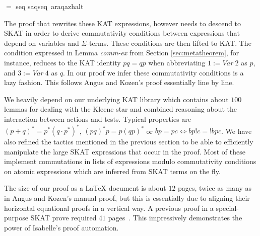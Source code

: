 \documentclass{llncs}
\begin{document}
\begin{isabellebody}
$=$\isanewline
seq {}s{}{}a{}{}q{}{}{}{}{}seq\ {}{}a{}{}r{}{}{}a{}{}q{}{}{}{}{}a{}{}z{}{}halt{}{}\isanewline
\end{isabellebody}

\noindent The proof that rewrites these KAT expressions, however needs
to descend to SKAT in order to derive commutativity conditions between
expressions that depend on variables and $\Sigma$-terms. These
conditions are then lifted to KAT. The condition expressed in Lemma
\textit{comm-ex} from Section \ref{sec:metatheorem}, for instance,
reduces to the KAT identity $pq = qp$ when abbreviating $1 := Var\ 2$
as $p$, and $3 := Var\ 4$ as $q$. In our proof we infer these
commutativity conditions is a lazy fashion. This follows Angus and
Kozen's proof essentially line by line.

We heavily depend on our underlying KAT library which contains about
$100$ lemmas for dealing with the Kleene star and combined reasoning
about the interaction between actions and tests. Typical properties
are $(p+q)^\ast = p^\ast(q\cdot p^\ast)^\ast$, $(pq)^\ast p =
p(qp)^\ast$ or $bp = pc \Longleftrightarrow bp!c = !bpc$. We have also
refined the tactics mentioned in the previous section to be able to
efficiently manipulate the large SKAT expressions that occur in the
proof. Most of these implement commutations in lists of expressions
modulo commutativity conditions on atomic expressions which are
inferred from SKAT terms on the fly.

The size of our proof as a \LaTeX{} document is about $12$ pages,
twice as many as in Angus and Kozen's manual proof, but this is
essentially due to aligning their horizontal equational proofs in a
vertical way. A previous proof in a special-purpose SKAT prove
required $41$ pages~\cite{Aboul-Hosn}. This impressively demonstrates
the power of Isabelle's proof automation.
\end{document}
